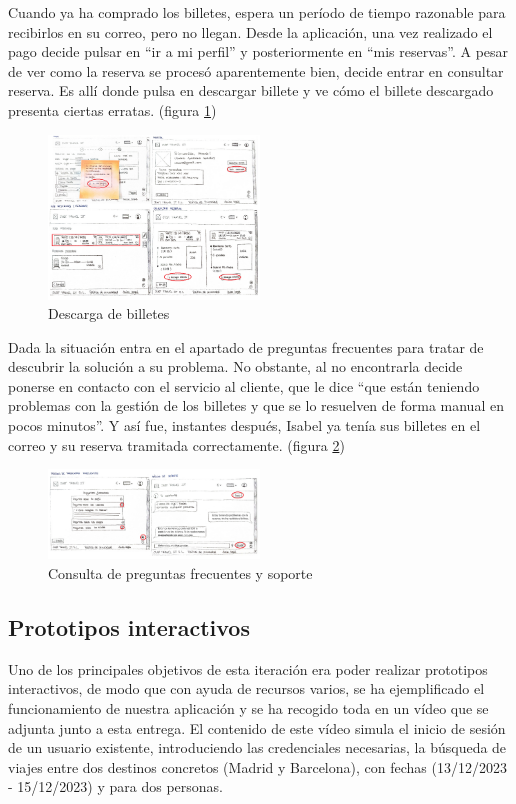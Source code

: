 Cuando ya ha comprado los billetes, espera un período de tiempo razonable para recibirlos en su correo, pero no llegan. Desde la aplicación, una vez realizado el 
pago decide pulsar en “ir a mi perfil” y posteriormente en “mis reservas”. A pesar de ver como la reserva se procesó aparentemente bien, decide entrar en consultar 
reserva. Es allí donde pulsa en descargar billete y ve cómo el billete descargado presenta ciertas erratas. (figura \ref{fig:Isabel7})
\begin{figure}[h]
    \centering
    \includegraphics[width=0.5\textwidth]{Imagenes/Keypath/Isabel7.png}
    \caption{Descarga de billetes}
    \label{fig:Isabel7}
\end{figure}

Dada la situación entra en el apartado de preguntas frecuentes para tratar de descubrir la solución a su problema. No obstante, al no encontrarla decide ponerse en 
contacto con el servicio al cliente, que le dice “que están teniendo problemas con la gestión de los billetes y que se lo resuelven de forma manual en pocos minutos”. 
Y así fue, instantes después, Isabel ya tenía sus billetes en el correo y su reserva tramitada correctamente. (figura \ref{fig:Isabel8})
\begin{figure}[h]
    \centering
    \includegraphics[width=0.5\textwidth]{Imagenes/Keypath/Isabel8.png}
    \caption{Consulta de preguntas frecuentes y soporte}
    \label{fig:Isabel8}
\end{figure}

\subsection{Prototipos interactivos}
Uno de los principales objetivos de esta iteración era poder realizar prototipos interactivos, de modo que con ayuda de recursos varios, se ha ejemplificado el funcionamiento
de nuestra aplicación y se ha recogido toda en un vídeo que se adjunta junto a esta entrega. El contenido de este vídeo simula el inicio de sesión de un usuario existente,
introduciendo las credenciales necesarias, la búsqueda de viajes entre dos destinos concretos (Madrid y Barcelona), con fechas (13/12/2023 - 15/12/2023) y para dos personas. \\

